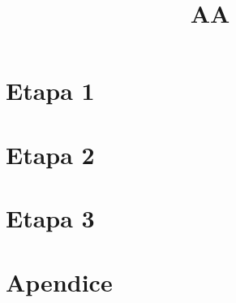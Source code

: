 \documentclass[hidelinks,a4paper,12pt, nofootinbib]{article}
\title{AA}
\begin{document}
\maketitle

\tableofcontents
\newpage


\section{Etapa 1}

\newpage

\section{Etapa 2}

\newpage

\section{Etapa 3}



\newpage
\printbibliography
\appendix
\section{Apendice}\label{App:Appendix}

\end{document}
